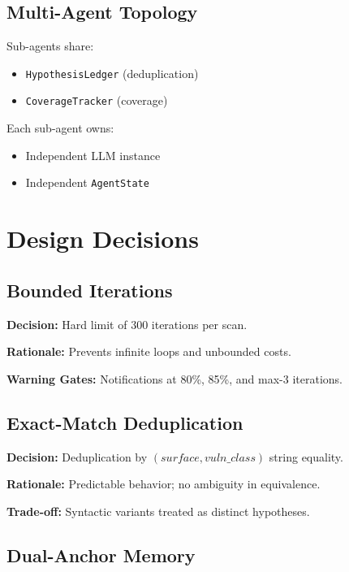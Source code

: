 \documentclass[11pt,a4paper]{article}
\theoremstyle{definition}
\newcommand{\code}[1]{\texttt{#1}}
\begin{document}
\subsection{Multi-Agent Topology}

Sub-agents share:
\begin{itemize}[leftmargin=*]
    \item \code{HypothesisLedger} (deduplication)
    \item \code{CoverageTracker} (coverage)
\end{itemize}

Each sub-agent owns:
\begin{itemize}[leftmargin=*]
    \item Independent LLM instance
    \item Independent \code{AgentState}
\end{itemize}

\section{Design Decisions}
\label{sec:design}

\subsection{Bounded Iterations}

\textbf{Decision:} Hard limit of 300 iterations per scan.

\textbf{Rationale:} Prevents infinite loops and unbounded costs.

\textbf{Warning Gates:} Notifications at 80\%, 85\%, and max-3 iterations.

\subsection{Exact-Match Deduplication}

\textbf{Decision:} Deduplication by $(surface, vuln\_class)$ string equality.

\textbf{Rationale:} Predictable behavior; no ambiguity in equivalence.

\textbf{Trade-off:} Syntactic variants treated as distinct hypotheses.

\subsection{Dual-Anchor Memory}
\end{document}
